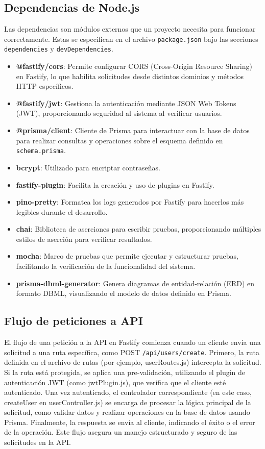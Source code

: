 \subsection{Dependencias de Node.js}
 Las dependencias son módulos externos que un proyecto necesita para funcionar correctamente. Estas se especifican en el archivo \texttt{package.json} bajo las secciones \texttt{dependencies} y \texttt{devDependencies}.
\begin{itemize} 
	\item \textbf{@fastify/cors}: Permite configurar CORS (Cross-Origin Resource Sharing) en Fastify, lo que habilita solicitudes desde distintos dominios y métodos HTTP específicos. 
	\item \textbf{@fastify/jwt}: Gestiona la autenticación mediante JSON Web Tokens (JWT), proporcionando seguridad al sistema al verificar usuarios. 
	\item \textbf{@prisma/client}: Cliente de Prisma para interactuar con la base de datos para realizar consultas y operaciones sobre el esquema definido en \texttt{schema.prisma}. 
	\item \textbf{bcrypt}: Utilizado para encriptar contraseñas.
	\item \textbf{fastify-plugin}: Facilita la creación y uso de plugins en Fastify. 
	\item \textbf{pino-pretty}: Formatea los logs generados por Fastify para hacerlos más legibles durante el desarrollo. 
	\item \textbf{chai}: Biblioteca de aserciones para escribir pruebas, proporcionando múltiples estilos de aserción para verificar resultados. 
	\item \textbf{mocha}: Marco de pruebas que permite ejecutar y estructurar pruebas, facilitando la verificación de la funcionalidad del sistema.  
	\item \textbf{prisma-dbml-generator}: Genera diagramas de entidad-relación (ERD) en formato DBML, visualizando el modelo de datos definido en Prisma.
\end{itemize}

\subsection{Flujo de peticiones a API} El flujo de una petición a la API en Fastify comienza cuando un cliente envía una solicitud a una ruta específica, como POST \texttt{/api/users/create}. Primero, la ruta definida en el archivo de rutas (por ejemplo, userRoutes.js) intercepta la solicitud. Si la ruta está protegida, se aplica una pre-validación, utilizando el plugin de autenticación JWT (como jwtPlugin.js), que verifica que el cliente esté autenticado. Una vez autenticado, el controlador correspondiente (en este caso, createUser en userController.js) se encarga de procesar la lógica principal de la solicitud, como validar datos y realizar operaciones en la base de datos usando Prisma. Finalmente, la respuesta se envía al cliente, indicando el éxito o el error de la operación. Este flujo asegura un manejo estructurado y seguro de las solicitudes en la API.

